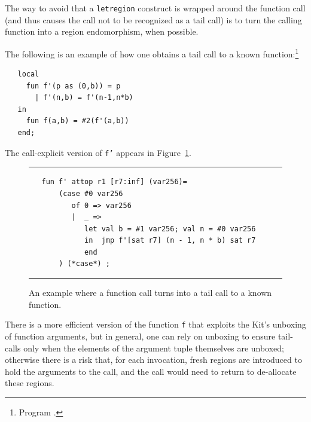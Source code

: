 \documentclass[12pt]{book}
\begin{document}
The way to avoid that a {\tt letregion} construct is wrapped around
the function call (and thus causes the call not to be recognized as a
tail call) is to turn the calling function into a region endomorphism,
when possible.

The following is an example of how one obtains a tail call to a known
function:\footnote{Program .}
\begin{verbatim}
   local
     fun f'(p as (0,b)) = p
       | f'(n,b) = f'(n-1,n*b)
   in
     fun f(a,b) = #2(f'(a,b))
   end;
\end{verbatim}
The call-explicit version of {\tt f'} appears in
Figure~\ref{tail.fig}.
\begin{figure}
\hrule \medskip
\begin{verbatim}
   fun f' attop r1 [r7:inf] (var256)= 
       (case #0 var256 
          of 0 => var256
          |  _ => 
             let val b = #1 var256; val n = #0 var256
             in  jmp f'[sat r7] (n - 1, n * b) sat r7
             end 
       ) (*case*) ; 
\end{verbatim}
\caption{An example where a function call turns into a tail call to a known function.}  
\medskip \hrule
\label{tail.fig}
\end{figure}

There is a more efficient version of the function {\tt f} that
exploits the Kit's unboxing of function arguments, but in general, one
can rely on unboxing to ensure tail-calls only when the elements of
the argument tuple themselves are unboxed; otherwise there is a risk
that, for each invocation, fresh regions are introduced to hold the
arguments to the call, and the call would need to return to
de-allocate these regions.
\end{document}
